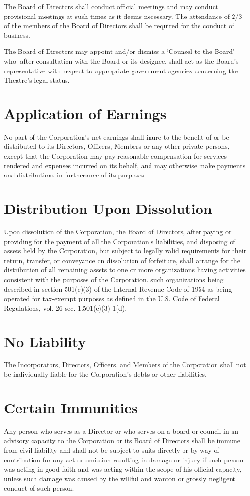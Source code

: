 \documentclass{article}
\begin{document}
\begin{outline}[enumerate]
\1 The Board of Directors shall conduct official meetings and may conduct
provisional meetings at such times as it deems necessary.  The attendance of
2/3 of the members of the Board of Directors shall be required for the conduct
of business.

\1 The Board of Directors may appoint and/or dismiss a ‘Counsel to the Board’
who, after consultation with the Board or its designee, shall act as the
Board’s representative with respect to appropriate government agencies
concerning the Theatre’s legal status.

\end{outline}

\section{Application of Earnings}
No part of the Corporation’s net earnings shall inure to the benefit of or be
distributed to its Directors, Officers, Members or any other private persons,
except that the Corporation may pay reasonable compensation for services
rendered and expenses incurred on its behalf, and may otherwise make payments
and distributions in furtherance of its purposes.

\section{Distribution Upon Dissolution}
Upon dissolution of the Corporation, the Board of Directors, after paying or
providing for the payment of all the Corporation’s liabilities, and disposing
of assets held by the Corporation, but subject to legally valid requirements
for their return, transfer, or conveyance on dissolution of forfeiture, shall
arrange for the distribution of all remaining assets to one or more
organizations having activities consistent with the purposes of the
Corporation, such organizations being described in section  501(c)(3) of the
Internal Revenue Code of 1954 as being operated for tax-exempt purposes as
defined in the U.S. Code of Federal Regulations, vol. 26 sec. 1.501(c)(3)-1(d).

\section{No Liability}
The Incorporators, Directors, Officers, and Members of the Corporation shall
not be individually liable for the Corporation’s debts or other liabilities.

\section{Certain Immunities}
Any person who serves as a Director or who serves on a board or council in an
advisory capacity to the Corporation or its Board of Directors shall be immune
from civil liability and shall not be subject to suits directly or by way of
contribution for any act or omission resulting in damage or injury if such
person was acting in good faith and was acting within the scope of his official
capacity, unless such damage was caused by the willful and wanton or grossly
negligent conduct of such person.
\end{document}

